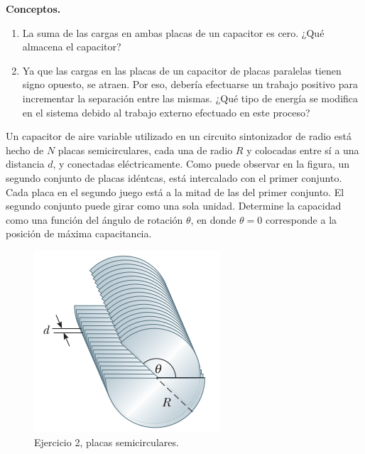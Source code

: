 \begin{mdframed}[style=warning]
	\begin{ejercicio}
		\textbf{Conceptos.}
		\begin{enumerate}
			\item La suma de las cargas en ambas placas de un capacitor es cero. ¿Qué almacena el capacitor?
			\item Ya que las cargas en las placas de un capacitor de placas paralelas tienen signo opuesto, se atraen. Por eso, debería efectuarse un trabajo positivo para incrementar la separación entre las mismas. ¿Qué tipo de energía se modifica en el sistema debido al trabajo externo efectuado en este proceso?
		\end{enumerate}
	\end{ejercicio}
\end{mdframed}






\begin{mdframed}[style=warning]
	\begin{ejercicio}
		\begin{multicols}{2}
			Un capacitor de aire variable utilizado en un circuito sintonizador de radio está hecho de $N$ placas semicirculares, cada una de radio $R$ y colocadas entre sí a una distancia $d$, y conectadas eléctricamente. Como puede observar en la figura, un segundo conjunto de placas idéntcas, está intercalado con el primer conjunto. Cada placa en el segundo juego está a la mitad de las del primer conjunto. El segundo conjunto puede girar como una sola unidad. Determine la capacidad como una función del ángulo de rotación $\theta$, en donde $\theta = 0$ corresponde a la posición de máxima capacitancia.
			\columnbreak
			\begin{figure}[H]
				\centering
				\includegraphics[scale=0.55]{./img/cap.png}
				\caption{Ejercicio 2, placas semicirculares.}
				\label{ej2}
			\end{figure}
		\end{multicols}
	\end{ejercicio}
\end{mdframed}



